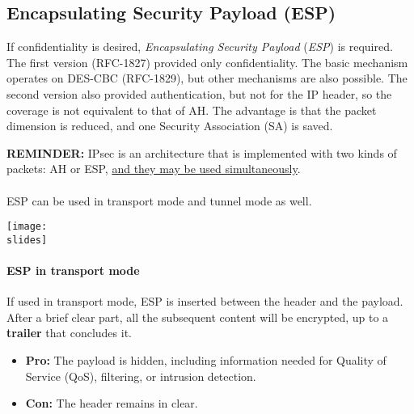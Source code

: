 \subsection{Encapsulating Security Payload (ESP)}
If confidentiality is desired, \textit{Encapsulating Security Payload} (\textit{ESP}) is required.
The first version (RFC-1827) provided only confidentiality. The basic mechanism operates on DES-CBC (RFC-1829), but other mechanisms are also possible. The second version also provided authentication, but not for the IP header, so the coverage is not equivalent to that of AH. The advantage is that the packet dimension is reduced, and one Security Association (SA) is saved.

\textbf{REMINDER:} IPsec is an architecture that is implemented with two kinds of packets: AH or ESP, \underline{and they may be used simultaneously}.

\paragraph*{}
ESP can be used in transport mode and tunnel mode as well.

\vspace*{5mm}
\noindent
\begin{minipage}{0.5\textwidth}
    \centering
    \texttt{[image: \\slides]}
\end{minipage}
\hspace{0.05\textwidth}
\begin{minipage}{0.4\textwidth}
    \paragraph{ESP in transport mode}
    If used in transport mode, ESP is inserted between the header and the payload. After a brief clear part, all the subsequent content will be encrypted, up to a \textbf{trailer} that concludes it.
    \begin{itemize}
        \item \textbf{Pro:} The payload is hidden, including information needed for Quality of Service (QoS), filtering, or intrusion detection.
        \item \textbf{Con:} The header remains in clear.
    \end{itemize}
\end{minipage}


